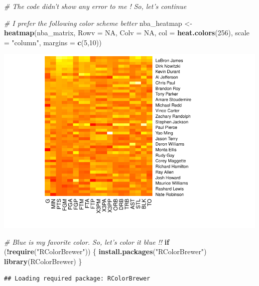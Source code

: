\documentclass[]{article}
\newenvironment{Shaded}{\begin{snugshade}}{\end{snugshade}}
\newcommand{\CommentTok}[1]{\textcolor[rgb]{0.56,0.35,0.01}{\textit{#1}}}
\newcommand{\ControlFlowTok}[1]{\textcolor[rgb]{0.13,0.29,0.53}{\textbf{#1}}}
\newcommand{\DataTypeTok}[1]{\textcolor[rgb]{0.13,0.29,0.53}{#1}}
\newcommand{\DecValTok}[1]{\textcolor[rgb]{0.00,0.00,0.81}{#1}}
\newcommand{\KeywordTok}[1]{\textcolor[rgb]{0.13,0.29,0.53}{\textbf{#1}}}
\newcommand{\NormalTok}[1]{#1}
\newcommand{\OperatorTok}[1]{\textcolor[rgb]{0.81,0.36,0.00}{\textbf{#1}}}
\newcommand{\OtherTok}[1]{\textcolor[rgb]{0.56,0.35,0.01}{#1}}
\newcommand{\StringTok}[1]{\textcolor[rgb]{0.31,0.60,0.02}{#1}}
\begin{document}
\begin{Shaded}
\begin{Highlighting}[]
\CommentTok{# The code didn't show any error to me ! So, let's continue}

\CommentTok{# I prefer the following color scheme better}
\NormalTok{nba_heatmap <-}\StringTok{ }\KeywordTok{heatmap}\NormalTok{(nba_matrix, }\DataTypeTok{Rowv =} \OtherTok{NA}\NormalTok{, }
                       \DataTypeTok{Colv =} \OtherTok{NA}\NormalTok{, }
                       \DataTypeTok{col =} \KeywordTok{heat.colors}\NormalTok{(}\DecValTok{256}\NormalTok{),}
                       \DataTypeTok{scale =} \StringTok{"column"}\NormalTok{,}
                       \DataTypeTok{margins =} \KeywordTok{c}\NormalTok{(}\DecValTok{5}\NormalTok{,}\DecValTok{10}\NormalTok{))}
\end{Highlighting}
\end{Shaded}

\includegraphics{Day_5_files/figure-latex/unnamed-chunk-34-2.pdf}

\begin{Shaded}
\begin{Highlighting}[]
\CommentTok{# Blue is my favorite color. So, let's color it blue !!}
\ControlFlowTok{if}\NormalTok{ (}\OperatorTok{!}\KeywordTok{require}\NormalTok{(}\StringTok{"RColorBrewer"}\NormalTok{)) \{}
\KeywordTok{install.packages}\NormalTok{(}\StringTok{"RColorBrewer"}\NormalTok{)}
\KeywordTok{library}\NormalTok{(RColorBrewer)}
\NormalTok{\}}
\end{Highlighting}
\end{Shaded}

\begin{verbatim}
## Loading required package: RColorBrewer
\end{verbatim}
\end{document}
